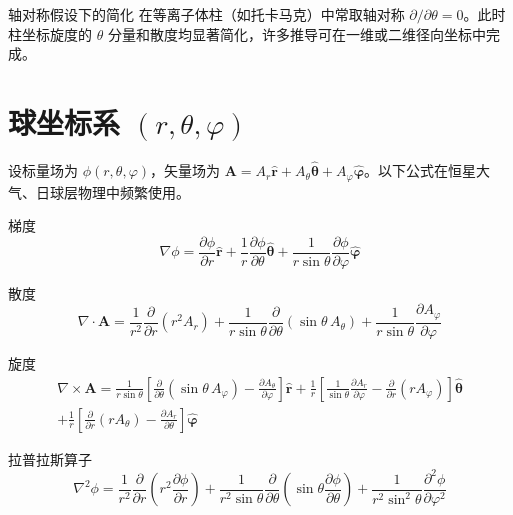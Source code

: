 \documentclass[12pt,a4paper,openany,oneside]{book}
\newcommand{\vect}[1]{\bm{#1}}
\newcommand{\unitvec}[1]{\hat{\vect{#1}}}
\newcommand{\grad}{\nabla}
\newcommand{\curl}{\nabla\times}
\newcommand{\divg}{\nabla\cdot}
\newcommand{\lap}{\nabla^2}
\begin{document}
\begin{insight}{轴对称假设下的简化}{}
在等离子体柱（如托卡马克）中常取轴对称 $\partial/\partial\theta=0$。此时柱坐标旋度的 $\theta$ 分量和散度均显著简化，许多推导可在一维或二维径向坐标中完成。
\end{insight}


\section{球坐标系 $(r,\theta,\varphi)$}

设标量场为 $\phi(r,\theta,\varphi)$，矢量场为 $\vect{A}=A_r\unitvec{r}+A_\theta\unitvec{\theta}+A_\varphi\unitvec{\varphi}$。以下公式在恒星大气、日球层物理中频繁使用。

\begin{definition}{梯度}{}{}
\begin{equation}
\grad\phi = \frac{\partial \phi}{\partial r}\unitvec{r}
+ \frac{1}{r}\frac{\partial \phi}{\partial \theta}\unitvec{\theta}
+ \frac{1}{r\sin\theta}\frac{\partial \phi}{\partial \varphi}\unitvec{\varphi}
\end{equation}
\end{definition}

\begin{definition}{散度}{}{}
\begin{equation}
\divg\vect{A} = \frac{1}{r^2}\frac{\partial }{\partial r}(r^2A_r)
+ \frac{1}{r\sin\theta}\frac{\partial }{\partial \theta}(\sin\theta\,A_\theta)
+ \frac{1}{r\sin\theta}\frac{\partial A_\varphi}{\partial \varphi}
\end{equation}
\end{definition}

\begin{definition}{旋度}{}{}
\begin{multline}
\curl\vect{A} =
\frac{1}{r\sin\theta}\left[\frac{\partial }{\partial \theta}(\sin\theta\,A_\varphi)-\frac{\partial A_\theta}{\partial \varphi}\right]\unitvec{r}
+ \frac{1}{r}\left[\frac{1}{\sin\theta}\frac{\partial A_r}{\partial \varphi}-\frac{\partial }{\partial r}(rA_\varphi)\right]\unitvec{\theta} \\[6pt]
+ \frac{1}{r}\left[\frac{\partial }{\partial r}(rA_\theta)-\frac{\partial A_r}{\partial \theta}\right]\unitvec{\varphi}
\end{multline}
\end{definition}

\begin{definition}{拉普拉斯算子}{}{}
\begin{equation}
\lap\phi = \frac{1}{r^2}\frac{\partial }{\partial r}\!\left(r^2\frac{\partial \phi}{\partial r}\right)
+ \frac{1}{r^2\sin\theta}\frac{\partial }{\partial \theta}\!\left(\sin\theta\frac{\partial \phi}{\partial \theta}\right)
+ \frac{1}{r^2\sin^2\theta}\frac{\partial^2 \phi}{\partial \varphi^2}
\end{equation}
\end{definition}
\end{document}
